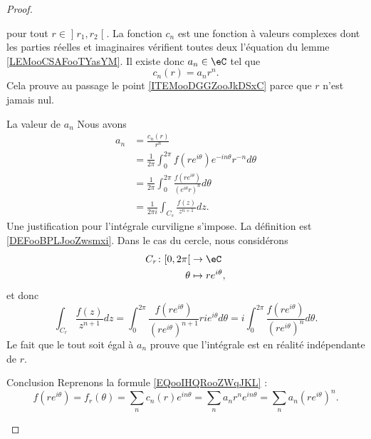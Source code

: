 \begin{proof}
\begin{subproof}
			pour tout \( r\in \mathopen] r_1 , r_2 \mathclose[\). La fonction \( c_n\) est une fonction à valeurs complexes dont les parties réelles et imaginaires vérifient toutes deux l'équation du lemme \ref{LEMooCSAFooTYasYM}. Il existe donc \( a_n\in \eC\) tel que
			\begin{equation}
				c_n(r)=a_nr^n.
			\end{equation}
			Cela prouve au passage le point \ref{ITEMooDGGZooJkDSxC} parce que \( r\) n'est jamais nul.
			\item[La valeur de \( a_n\)]
			Nous avons
			\begin{equation}        \label{EQooFNUHooZbbNAT}
				\begin{aligned}
					a_n & =\frac{ c_n(r) }{ r^n }                                                               \\
					    & =\frac{1}{ 2\pi }\int_0^{2\pi}f(r e^{i\theta}) e^{-in\theta}r^{-n}d\theta             \\
					    & =\frac{1}{ 2\pi }  \int_0^{2\pi}\frac{ f(r e^{i\theta}) }{ ( e^{i\theta}r)^n }d\theta \\
					    & =\frac{1}{ 2\pi i }\int_{C_s}\frac{ f(z) }{ z^{n+1} }dz.
				\end{aligned}
			\end{equation}
			Une justification pour l'intégrale curviligne s'impose. La définition est \ref{DEFooBPLJooZwsmxi}. Dans le cas du cercle, nous considérons
			\begin{equation}
				\begin{aligned}
					C_r\colon \mathopen[ 0 , 2\pi \mathclose[ & \to \eC                \\
					\theta                                    & \mapsto r e^{i\theta},
				\end{aligned}
			\end{equation}
			et donc
			\begin{equation}
				\int_{C_r}\frac{ f(z) }{ z^{n+1} }dz=\int_0^{2\pi}\frac{ f(r e^{i\theta}) }{ (r e^{i\theta})^{n+1} }ri e^{i\theta}d\theta=i\int_0^{2\pi}\frac{ f(r e^{i\theta}) }{ (r e^{i\theta})^n }d\theta.
			\end{equation}
			Le fait que le tout soit égal à \( a_n\) prouve que l'intégrale est en réalité indépendante de \( r\).
			\item[Conclusion]
			Reprenons la formule \eqref{EQooIHQRooZWqJKL} :
			\begin{equation}
				f(r e^{i\theta})=f_r(\theta)=\sum_nc_n(r) e^{in\theta}=\sum_na_nr^n e^{in\theta}=\sum_na_n(r e^{i\theta})^n.

\end{equation}
\end{subproof}
\end{proof}
